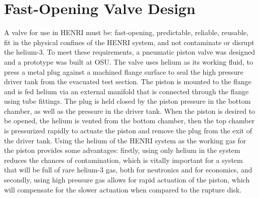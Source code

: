 \section{Fast-Opening Valve Design} \label{s:design}
A valve for use in HENRI must be: fast-opening, predictable, reliable, reusable, fit in the physical confines of the HENRI system, and not contaminate or disrupt the helium-3. 
To meet these requirements, a pneumatic piston valve was designed and a prototype was built at OSU. The valve uses helium as its working fluid, to press a metal plug against a machined flange surface to seal the high pressure driver tank from the evacuated test section. The piston is mounted to the flange and is fed helium via an external manifold that is connected through the flange using tube fittings. The plug is held closed by the piston pressure in the bottom chamber, as well as the pressure in the driver tank. When the piston is desired to be opened, the helium is vented from the bottom chamber, then the top chamber is pressurized rapidly to actuate the piston and remove the plug from the exit of the driver tank. Using the helium of the HENRI system as the working gas for the piston provides some advantages: firstly, using only helium in the system reduces the chances of contamination, which is vitally important for a system that will be full of rare helium-3 gas, both for neutronics and for economics, and secondly, using high pressure gas allows for rapid actuation of the piston, which will compensate for the slower actuation when compared to the rupture disk.



